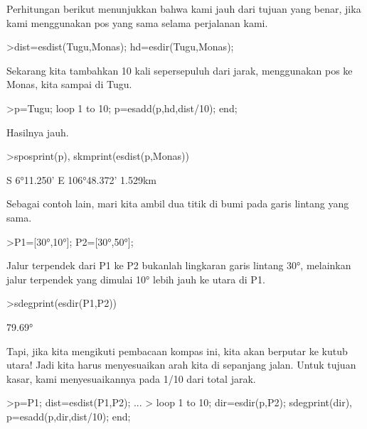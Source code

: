 \documentclass[a4paper,10pt]{article}
\begin{document}
\begin{eulernotebook}
\begin{eulercomment}
\begin{eulercomment}
\begin{eulercomment}
Perhitungan berikut menunjukkan bahwa kami jauh dari tujuan yang
benar, jika kami menggunakan pos yang sama selama perjalanan kami.
\end{eulercomment}
\begin{eulerprompt}
>dist=esdist(Tugu,Monas); hd=esdir(Tugu,Monas);
\end{eulerprompt}
\begin{eulercomment}
Sekarang kita tambahkan 10 kali sepersepuluh dari jarak, menggunakan
pos ke Monas, kita sampai di Tugu.
\end{eulercomment}
\begin{eulerprompt}
>p=Tugu; loop 1 to 10; p=esadd(p,hd,dist/10); end;
\end{eulerprompt}
\begin{eulercomment}
Hasilnya jauh.
\end{eulercomment}
\begin{eulerprompt}
>sposprint(p), skmprint(esdist(p,Monas))
\end{eulerprompt}
\begin{euleroutput}
  S 6°11.250' E 106°48.372'
       1.529km
\end{euleroutput}
\begin{eulercomment}
Sebagai contoh lain, mari kita ambil dua titik di bumi pada garis
lintang yang sama.
\end{eulercomment}
\begin{eulerprompt}
>P1=[30°,10°]; P2=[30°,50°];
\end{eulerprompt}
\begin{eulercomment}
Jalur terpendek dari P1 ke P2 bukanlah lingkaran garis lintang 30°,
melainkan jalur terpendek yang dimulai 10° lebih jauh ke utara di P1.
\end{eulercomment}
\begin{eulerprompt}
>sdegprint(esdir(P1,P2))
\end{eulerprompt}
\begin{euleroutput}
       79.69°
\end{euleroutput}
\begin{eulercomment}
Tapi, jika kita mengikuti pembacaan kompas ini, kita akan berputar ke
kutub utara! Jadi kita harus menyesuaikan arah kita di sepanjang
jalan. Untuk tujuan kasar, kami menyesuaikannya pada 1/10 dari total
jarak.
\end{eulercomment}
\begin{eulerprompt}
>p=P1;  dist=esdist(P1,P2); ...
>  loop 1 to 10; dir=esdir(p,P2); sdegprint(dir), p=esadd(p,dir,dist/10); end;
\end{eulerprompt}

\end{eulercomment}
\end{eulercomment}
\end{eulernotebook}
\end{document}
